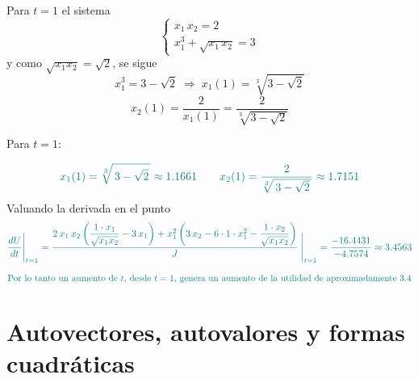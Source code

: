 \documentclass{article}
\begin{document}
Para \(t = 1\) el sistema
\[
\begin{cases}
x_1\,x_2 = 2\\[6pt]
x_1^3 + \sqrt{x_1\,x_2} = 3
\end{cases}
\]
y como \(\sqrt{x_1x_2} = \sqrt{2}\), se sigue
\[
x_1^3 = 3 - \sqrt{2}
\;\Longrightarrow\;
x_1(1) = \sqrt[3]{3 - \sqrt{2}}
\]
\[
x_2(1) = \frac{2}{x_1(1)}
= \frac{2}{\sqrt[3]{3 - \sqrt{2}}}
\]

Para \(t=1\):

\[ \color{teal}
x_1(1)=\sqrt[3]{\,3-\sqrt{2}\,}\approx 1.1661
\qquad
x_2(1)=\frac{2}{\sqrt[3]{\,3-\sqrt{2}\,}}\approx 1.7151
\]
Valuando la derivada en el punto 
\[ \color{teal}
\frac{dU}{dt}\Bigg|_{t=1}
=\frac{2\,x_1\,x_2\left(\dfrac{1\cdot x_1}{\sqrt{x_1x_2}}-3\,x_1\right)
+
x_1^2\left(3\,x_2-6\cdot1\cdot x_1^2-\dfrac{1\cdot x_2}{\sqrt{x_1x_2}}\right)}%
{J}
\;\Bigg|_{t=1}
=\frac{-16.4431}{-4.7574}
\approx 3.4563
\]

\[\text{\color{teal}Por lo tanto un aumento de $t$, desde $t=1$, genera un aumento de la utilidad de aproximadamente 3.4}\]



\newpage
\section{Autovectores, autovalores y formas cuadráticas}
\end{document}
